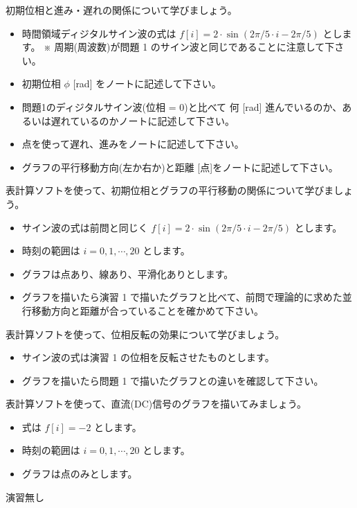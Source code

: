 \documentclass[a4paper]{jarticle}
\begin{document}
\newpage

 初期位相と進み・遅れの関係について学びましょう。
\par\vspace{1zh}
\begin{itemize}
\item 時間領域ディジタルサイン波の式は $f[i] = 2 \cdot \sin( 2\pi / 5 \cdot i - 2\pi/5)$ とします。
※ 周期(周波数)が問題 1 のサイン波と同じであることに注意して下さい。
\item 初期位相 $\phi$ [rad] をノートに記述して下さい。
\item 問題1のディジタルサイン波(位相 = $0$)と比べて 何 [rad] 進んでいるのか、あるいは遅れているのかノートに記述して下さい。
\item 点を使って遅れ、進みをノートに記述して下さい。
\item グラフの平行移動方向(左か右か)と距離 [点]をノートに記述して下さい。
\end{itemize}

 表計算ソフトを使って、初期位相とグラフの平行移動の関係について学びましょう。
\par\vspace{1zh}
\begin{itemize}
\item サイン波の式は前問と同じく $f[i] = 2 \cdot \sin( 2\pi / 5 \cdot i - 2\pi/5)$ とします。
\item 時刻の範囲は $i = 0, 1,  \cdots, 20$ とします。
\item グラフは点あり、線あり、平滑化ありとします。
\item グラフを描いたら演習 1 で描いたグラフと比べて、前問で理論的に求めた並行移動方向と距離が合っていることを確かめて下さい。
\end{itemize}


 表計算ソフトを使って、位相反転の効果について学びましょう。
\par\vspace{1zh}
\begin{itemize}
\item サイン波の式は演習 1 の位相を反転させたものとします。
\item グラフを描いたら問題 1 で描いたグラフとの違いを確認して下さい。
\end{itemize}


 表計算ソフトを使って、直流(DC)信号のグラフを描いてみましょう。
\par\vspace{1zh}
\begin{itemize}
\item 式は $f[i] = -2$ とします。
\item 時刻の範囲は $i = 0, 1,  \cdots, 20$ とします。
\item グラフは点のみとします。
\end{itemize}



\vspace{2zh}
\noindent 演習無し

\savepractime
\end{document}
